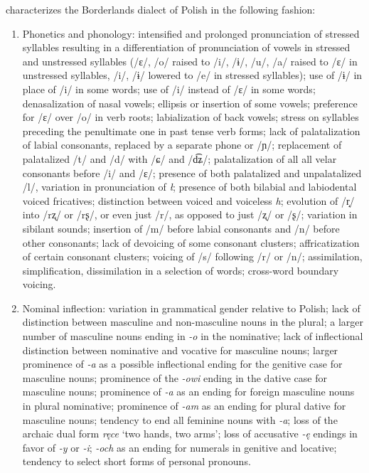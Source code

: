 \citet{kurzowa_1983} characterizes the Borderlands dialect of Polish in the following fashion:
\begin{enumerate}
    \item Phonetics and phonology: intensified and prolonged pronunciation of stressed syllables resulting in a differentiation of pronunciation of vowels in stressed and unstressed syllables (/ɛ/, /o/ raised to /i/, /ɨ/, /u/, /a/ raised to /ɛ/ in unstressed syllables, /i/, /ɨ/ lowered to /e/ in stressed syllables); use of /ɨ/ in place of /i/ in some words; use of /i/ instead of /ɛ/ in some words; denasalization of nasal vowels; ellipsis or insertion of some vowels; preference for /ɛ/ over /o/ in verb roots; labialization of back vowels; stress on syllables preceding the penultimate one in past tense verb forms; lack of palatalization of labial consonants, replaced by a separate phone or /ɲ/; replacement of palatalized /t/ and /d/ with /ɕ/ and /d͡ʑ/; palatalization of all all velar consonants before /i/ and /ɛ/; presence of both palatalized and unpalatalized /l/, variation in pronunciation of \textit{ł}; presence of both bilabial and labiodental voiced fricatives; distinction between voiced and voiceless \textit{h}; evolution of /r̝/ into /rʐ/ or /rʂ/, or even just /r/, as opposed to just /ʐ/ or /ʂ/; variation in sibilant sounds; insertion of /m/ before labial consonants and /n/ before other consonants; lack of devoicing of some consonant clusters; affricatization of certain consonant clusters; voicing of /s/ following /r/ or /n/; assimilation, simplification, dissimilation in a selection of words; cross-word boundary voicing.
    
    \item Nominal inflection: variation in grammatical gender relative to Polish; lack of distinction between masculine and non-masculine nouns in the plural; a larger number of masculine nouns ending in \textit{-o} in the nominative; lack of inflectional distinction between nominative and vocative for masculine nouns; larger prominence of \textit{-a} as a possible inflectional ending for the genitive case for masculine nouns; prominence of the \textit{-owi} ending in the dative case for masculine nouns; prominence of \textit{-a} as an ending for foreign masculine nouns in plural nominative; prominence of \textit{-am} as an ending for plural dative for masculine nouns; tendency to end all feminine nouns with \textit{-a}; loss of the archaic dual form \textit{ręce} `two hands, two arms'; loss of accusative \textit{-ę} endings in favor of \textit{-y} or \textit{-i}; \textit{-och} as an ending for numerals in genitive and locative; tendency to select short forms of personal pronouns.
    

\end{enumerate}
